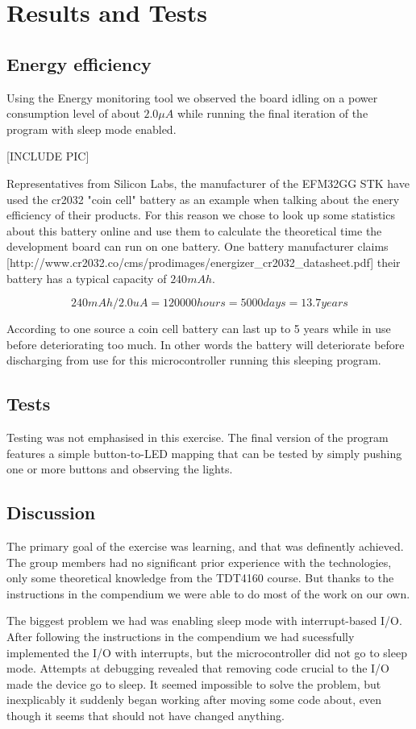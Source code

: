 \chapter{Results and Tests}
\label{chap:results}

\section{Energy efficiency}
Using the Energy monitoring tool we observed the board idling on a power consumption level of about $2.0 \mu A$ while running the final iteration of the program with sleep mode enabled.

[INCLUDE PIC]

Representatives from Silicon Labs, the manufacturer of the EFM32GG STK have used the cr2032 "coin cell" battery as an example when talking about the enery efficiency of their products. For this reason we chose to look up some statistics about this battery online and use them to calculate the theoretical time the development board can run on one battery. One battery manufacturer claims [http://www.cr2032.co/cms/prodimages/energizer\_cr2032\_datasheet.pdf] their battery has a typical capacity of $240 mAh$.

\[
	240 mAh / 2.0 uA = 120 000 hours = 5000 days = 13.7 years
\]

According to one source \cite{cr2032} a coin cell battery can last up to 5 years while in use before deteriorating too much. In other words the battery will deteriorate before discharging from use for this microcontroller running this sleeping program.

\section{Tests}
Testing was not emphasised in this exercise. The final version of the program features a simple button-to-LED mapping that can be tested by simply pushing one or more buttons and observing the lights.

\section{Discussion}
The primary goal of the exercise was learning, and that was definently achieved. The group members had no significant prior experience with the technologies, only some theoretical knowledge from the TDT4160 course. But thanks to the instructions in the compendium we were able to do most of the work on our own.

The biggest problem we had was enabling sleep mode with interrupt-based I/O. After following the instructions in the compendium we had sucessfully implemented the I/O with interrupts, but the microcontroller did not go to sleep mode. Attempts at debugging revealed that removing code crucial to the I/O made the device go to sleep. It seemed impossible to solve the problem, but inexplicably it suddenly began working after moving some code about, even though it seems that should not have changed anything.
